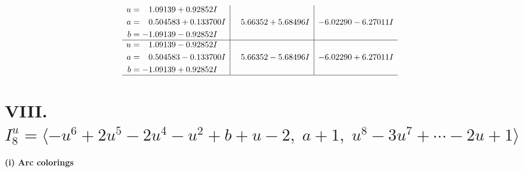 \documentclass[1p]{elsarticle_modified}
\theoremstyle{definition}
\begin{document}
$$\begin{array}{c|c|c}
\begin{aligned}
u &= \phantom{-}1.09139 + 0.92852 I \\
a &= \phantom{-}0.504583 + 0.133700 I \\
b &= -1.09139 - 0.92852 I\end{aligned}
 & \phantom{-}5.66352 + 5.68496 I & -6.02290 - 6.27011 I \\ \hline\begin{aligned}
u &= \phantom{-}1.09139 - 0.92852 I \\
a &= \phantom{-}0.504583 - 0.133700 I \\
b &= -1.09139 + 0.92852 I\end{aligned}
 & \phantom{-}5.66352 - 5.68496 I & -6.02290 + 6.27011 I\\
 \hline 
 \end{array}$$\newpage\newpage\renewcommand{\arraystretch}{1}
\centering \section*{VIII. $I^u_{8}= \langle - u^6+2 u^5-2 u^4- u^2+b+u-2,\;a+1,\;u^8-3 u^7+\cdots-2 u+1 \rangle$}
\flushleft \textbf{(i) Arc colorings}\\
\end{document}
